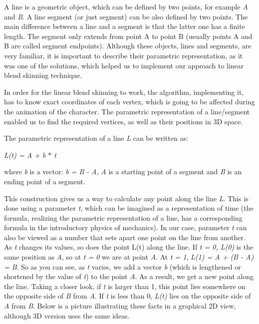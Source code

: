\documentclass[times, 10pt,twocolumn]{article}
\begin{document}
A line is a geometric object, which can be defined by two points, for example \emph{A} and \emph{B}. A line segment (or just segment) can be also defined by two points. The main difference between a line and a segment is that the latter one has a finite length. The segment only extends from point A to point B (usually points A and B are called segment endpoints). Although these objects, lines and segments, are very familiar, it is important to describe their parametric representation, as it was one of the solutions, which helped us to implement our approach to linear blend skinning technique.

In order for the linear blend skinning to work, the algorithm, implementing it, has to know exact coordinates of each vertex, which is going to be affected during the animation of the character. The parametric representation of a line/segment enabled us to find the required vertices, as well as their positions in 3D space.

The parametric representation of a line \emph{L} can be written as:
\begin{center}
\emph{L(t) = A + b $\ast$ t}
\end{center}
where \emph{b} is a vector: \emph{b = B - A}, \emph{A} is a starting point of a segment and \emph{B} is an ending point of a segment.

This construction gives us a way to calculate any point along the line \emph{L}. This is done using a parameter \emph{t}, which can be imagined as a representation of time (the formula, realizing the parametric representation of a line, has a corresponding formula in the introductory physics of mechanics). In our case, parameter \emph{t} can also be viewed as a number  that sets apart one point on the line from another. As \emph{t} changes its values, so does the point L(t)  along the line.
If \emph{t = 0, L(0)} is the same position as \emph{A}, so at \emph{t = 0} we are at point \emph{A}. At \emph{t = 1},  \emph{L(1) = A + (B - A) = B}. So as you can see, as \emph{t} varies, we add a vector \emph{b} (which is lengthened or shortened by the value of \emph{t}) to the point \emph{A}. As a result, we get a new point along the line. Taking a closer look, if \emph{t} is larger than 1, this point lies somewhere on the opposite side of \emph{B} from \emph{A}. If \emph{t} is less than 0, \emph{L(t)} lies on the opposite side of \emph{A} from \emph{B}. Below is a picture \label{line_in_space} illustrating these facts in a graphical 2D view, although 3D version uses the same ideas.
\end{document}
